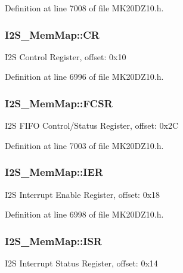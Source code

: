 Definition at line 7008 of file M\+K20\+D\+Z10.\+h.

\subsubsection[{\texorpdfstring{CR}{CR}}]{ I2\+S\+\_\+\+Mem\+Map\+::\+CR}\hypertarget{struct_i2_s___mem_map_ad70bbd1c7a51d298bb104d25640519e3}{}\label{struct_i2_s___mem_map_ad70bbd1c7a51d298bb104d25640519e3}
I2S Control Register, offset\+: 0x10 

Definition at line 6996 of file M\+K20\+D\+Z10.\+h.

\subsubsection[{\texorpdfstring{F\+C\+SR}{FCSR}}]{ I2\+S\+\_\+\+Mem\+Map\+::\+F\+C\+SR}\hypertarget{struct_i2_s___mem_map_a09382b9d3b2718d51b06d3462acfedf7}{}\label{struct_i2_s___mem_map_a09382b9d3b2718d51b06d3462acfedf7}
I2S F\+I\+FO Control/\+Status Register, offset\+: 0x2C 

Definition at line 7003 of file M\+K20\+D\+Z10.\+h.

\subsubsection[{\texorpdfstring{I\+ER}{IER}}]{ I2\+S\+\_\+\+Mem\+Map\+::\+I\+ER}\hypertarget{struct_i2_s___mem_map_a6bdf1b0b35f23718bbaca262c996ae21}{}\label{struct_i2_s___mem_map_a6bdf1b0b35f23718bbaca262c996ae21}
I2S Interrupt Enable Register, offset\+: 0x18 

Definition at line 6998 of file M\+K20\+D\+Z10.\+h.

\subsubsection[{\texorpdfstring{I\+SR}{ISR}}]{ I2\+S\+\_\+\+Mem\+Map\+::\+I\+SR}\hypertarget{struct_i2_s___mem_map_a5f35e4f64193292752424065399f520a}{}\label{struct_i2_s___mem_map_a5f35e4f64193292752424065399f520a}
I2S Interrupt Status Register, offset\+: 0x14 

